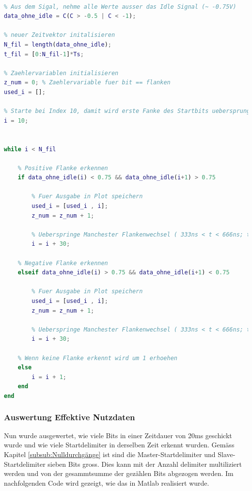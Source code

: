 \begin{lstlisting}[language=Matlab]
% ---- Nulldurchgaenge ---------------

% Aus dem Sigal, nehme alle Werte ausser das Idle Signal (~ -0.75V)
data_ohne_idle = C(C > -0.5 | C < -1);

% neuer Zeitvektor initalisieren
N_fil = length(data_ohne_idle);
t_fil = [0:N_fil-1]*Ts;

% Zaehlervariablen initialisieren
z_num = 0; % Zaehlervariable fuer bit == flanken
used_i = [];

% Starte bei Index 10, damit wird erste Fanke des Startbits uebersprungen
i = 10; 


while i < N_fil

    % Positive Flanke erkennen
    if data_ohne_idle(i) < 0.75 && data_ohne_idle(i+1) > 0.75

        % Fuer Ausgabe in Plot speichern
        used_i = [used_i , i];
        z_num = z_num + 1; 

        % Ueberspringe Manchester Flankenwechsel ( 333ns < t < 666ns; ts = 16ns --> i = i + 20...40)
        i = i + 30; 

    % Negative Flanke erkennen
    elseif data_ohne_idle(i) > 0.75 && data_ohne_idle(i+1) < 0.75

        % Fuer Ausgabe in Plot speichern
        used_i = [used_i , i]; 
        z_num = z_num + 1;

        % Ueberspringe Manchester Flankenwechsel ( 333ns < t < 666ns; ts = 16ns --> i = i + 20...40)
        i = i + 30; 
       
    % Wenn keine Flanke erkennt wird um 1 erhoehen
    else
        i = i + 1;
    end
end
\end{lstlisting}




\subsubsection{Auswertung Effektive Nutzdaten}
Nun wurde ausgewertet, wie viele Bits in einer Zeitdauer von 20ms geschickt wurde und wie viele Startdelimiter in derselben Zeit erkennt wurden. Gemäss Kapitel \ref{subsub:Nulldurchgänge} ist sind die Master-Startdelimiter und Slave-Startdelimiter sieben Bits gross. Dies kann mit der Anzahl delimiter multiliziert werden und von der gesammtsumme der gezählen Bits abgezogen werden. Im nachfolgenden Code wird gezeigt, wie das in Matlab realisiert wurde.

